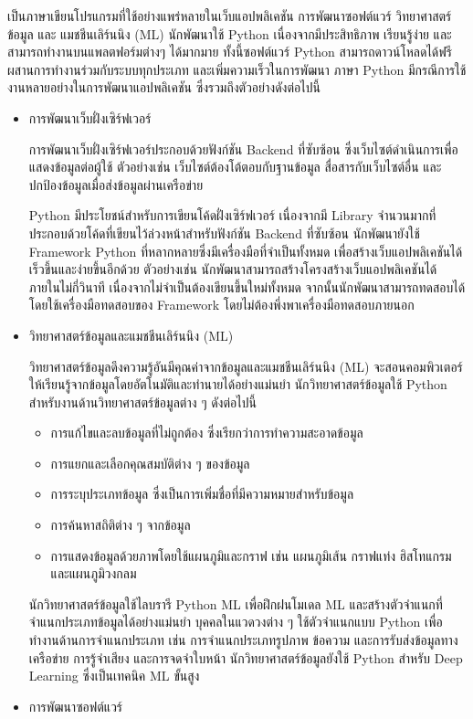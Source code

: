 \documentclass[12pt,oneside,openright,a4paper]{cpe-thai-project}
\begin{document}
\begin{itemize}
      \hspace{1cm}เป็นภาษาเขียนโปรแกรมที่ใช้อย่างแพร่หลายในเว็บแอปพลิเคชัน การพัฒนาซอฟต์แวร์ วิทยาศาสตร์ข้อมูล และ แมชชีนเลิร์นนิง (ML)
      นักพัฒนาใช้ Python เนื่องจากมีประสิทธิภาพ เรียนรู้ง่าย และสามารถทำงานบนแพลตฟอร์มต่างๆ ได้มากมาย ทั้งนี้ซอฟต์แวร์ Python สามารถดาวน์โหลดได้ฟรี 
      ผสานการทำงานร่วมกับระบบทุกประเภท และเพิ่มความเร็วในการพัฒนา 
      ภาษา Python มีกรณีการใช้งานหลายอย่างในการพัฒนาแอปพลิเคชัน ซึ่งรวมถึงตัวอย่างดังต่อไปนี้ \cite{python}
      \begin{itemize}
        \item การพัฒนาเว็บฝั่งเซิร์ฟเวอร์
        
        \hspace{1cm}การพัฒนาเว็บฝั่งเซิร์ฟเวอร์ประกอบด้วยฟังก์ชัน Backend ที่ซับซ้อน ซึ่งเว็บไซต์ดำเนินการเพื่อแสดงข้อมูลต่อผู้ใช้ 
        ตัวอย่างเช่น เว็บไซต์ต้องโต้ตอบกับฐานข้อมูล สื่อสารกับเว็บไซต์อื่น และปกป้องข้อมูลเมื่อส่งข้อมูลผ่านเครือข่าย 
        
        \hspace{1cm}Python มีประโยชน์สำหรับการเขียนโค้ดฝั่งเซิร์ฟเวอร์ เนื่องจากมี Library จำนวนมากที่ประกอบด้วยโค้ดที่เขียนไว้ล่วงหน้าสำหรับฟังก์ชัน Backend ที่ซับซ้อน 
        นักพัฒนายังใช้ Framework Python ที่หลากหลายซึ่งมีเครื่องมือที่จำเป็นทั้งหมด เพื่อสร้างเว็บแอปพลิเคชันได้เร็วขึ้นและง่ายขึ้นอีกด้วย ตัวอย่างเช่น นักพัฒนาสามารถสร้างโครงสร้างเว็บแอปพลิเคชันได้ภายในไม่กี่วินาที 
        เนื่องจากไม่จำเป็นต้องเขียนขึ้นใหม่ทั้งหมด จากนั้นนักพัฒนาสามารถทดสอบได้โดยใช้เครื่องมือทดสอบของ Framework โดยไม่ต้องพึ่งพาเครื่องมือทดสอบภายนอก
        \item วิทยาศาสตร์ข้อมูลและแมชชีนเลิร์นนิง (ML)
        
        \hspace{1cm}วิทยาศาสตร์ข้อมูลดึงความรู้อันมีคุณค่าจากข้อมูลและแมชชีนเลิร์นนิง (ML) จะสอนคอมพิวเตอร์ให้เรียนรู้จากข้อมูลโดยอัตโนมัติและทำนายได้อย่างแม่นยำ 
        นักวิทยาศาสตร์ข้อมูลใช้ Python สำหรับงานด้านวิทยาศาสตร์ข้อมูลต่าง ๆ ดังต่อไปนี้
          \begin{itemize}
            \item การแก้ไขและลบข้อมูลที่ไม่ถูกต้อง ซึ่งเรียกว่าการทำความสะอาดข้อมูล
            \item การแยกและเลือกคุณสมบัติต่าง ๆ ของข้อมูล
            \item การระบุประเภทข้อมูล ซึ่งเป็นการเพิ่มชื่อที่มีความหมายสำหรับข้อมูล
            \item การค้นหาสถิติต่าง ๆ จากข้อมูล
            \item การแสดงข้อมูลด้วยภาพโดยใช้แผนภูมิและกราฟ เช่น แผนภูมิเส้น กราฟแท่ง ฮิสโทแกรม และแผนภูมิวงกลม
          \end{itemize}
        \hspace{1cm}นักวิทยาศาสตร์ข้อมูลใช้ไลบรารี Python ML เพื่อฝึกฝนโมเดล ML และสร้างตัวจำแนกที่จำแนกประเภทข้อมูลได้อย่างแม่นยำ 
        บุคคลในแวดวงต่าง ๆ ใช้ตัวจำแนกแบบ Python เพื่อทำงานด้านการจำแนกประเภท เช่น การจำแนกประเภทรูปภาพ ข้อความ 
        และการรับส่งข้อมูลทางเครือข่าย การรู้จำเสียง และการจดจำใบหน้า นักวิทยาศาสตร์ข้อมูลยังใช้ Python สำหรับ Deep Learning ซึ่งเป็นเทคนิค ML ขั้นสูง
        \item การพัฒนาซอฟต์แวร์
        

\end{itemize}
\end{itemize}
\end{document}

